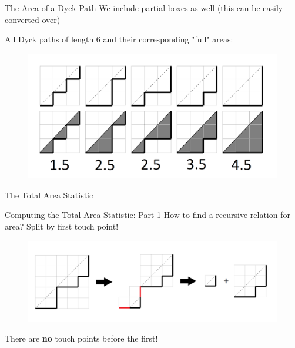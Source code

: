 \documentclass{beamer}
\begin{document}
\begin{frame}{The Area of a Dyck Path}
We include partial boxes as well (this can be easily converted over)

\begin{example}
All Dyck paths of length 6 and their corresponding "full" areas:
\begin{figure}
    \centering
    \includegraphics[width=0.75\linewidth]{path_and_new_area.png}
\end{figure}
\end{example}
\end{frame}

\begin{frame}{The Total Area Statistic}
    \newline


    
\end{frame}

\begin{frame}{Computing the Total Area Statistic: Part 1}
    How to find a recursive relation for area? Split by first touch point!

    \begin{figure}
        \centering
        \includegraphics[width=1\linewidth]{split_dyck.png}
    \end{figure}

    There are \textbf{no} touch points before the first!
\end{frame}
\end{document}
